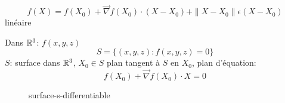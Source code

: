 \begin{eg}
   \[
       f(X) = f(X_0) + \vec{\nabla}f(X_0) \cdot (X - X_0) + \|X - X_0\| \epsilon(X - X_0)
   \]  
   linéaire
   \par
   Dans $\mathbb{R}^3$: $f(x, y, z)$
    \[
        S = \{(x, y, z): f(x, y, z) = 0 \}
   \] 
   $S$: surface dans  $\mathbb{R}^3$, $X_0 \in S$ plan tangent à $S$ en  $X_0$, plan d'équation:
   \[
       f(X_0) + \vec{\nabla}f(X_0)\cdot X = 0
   \] 
\begin{figure}[H]
    \centering
    \caption{surface-s-differentiable}
    \label{fig:surface-s-differentiable}
\end{figure}
\end{eg}
